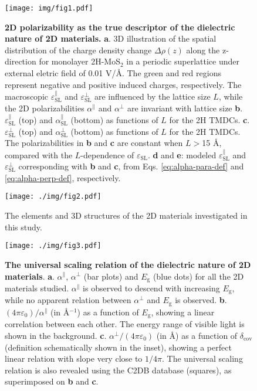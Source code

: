 \documentclass[journal=ancac3,manuscript=article,email=true,hyperref=true,keywords=false]{achemso}
\begin{document}
\label{sec:org34cbe74}
\begin{figure}[htbp]
\centering
\texttt{[image: img/fig1.pdf]}
\caption{\label{fig-1} \textbf{2D polarizability as the true
    descriptor of the dielectric nature of 2D materials.}
  \textbf{a}. 3D illustration of the spatial distribution of the
  charge density change $\Delta \rho(z)$ along the z-direction for
  monolayer 2H-MoS$_{2}$ in a periodic superlattice under external
  eletric field of 0.01 V/\AA{}.  The green and red regions represent
  negative and positive induced charges, respectively. The macroscopic
  $\varepsilon_{\mathrm{SL}}^{\parallel}$ and
  $\varepsilon_{\mathrm{SL}}^{\perp}$ are influenced by the lattice
  size $L$, while the 2D polarizabilities $\alpha^{\parallel}$ and
  $\alpha^{\perp}$ are invariant with lattice size \textbf{b}.
  $\varepsilon^{\parallel}_{\mathrm{SL}}$ (top) and
  $\alpha_{\mathrm{SL}}^{\parallel}$ (bottom) as functions of $L$ for
  the 2H TMDCs. \textbf{c}.  $\varepsilon^{\perp}_{\mathrm{SL}}$ (top)
  and $\alpha_{\mathrm{SL}}^{\perp}$ (bottom) as functions of $L$ for
  the 2H TMDCs. The polarizabilities in \textbf{b} and \textbf{c} are
  constant when $L>$15 \AA{}, compared with the $L$-dependence of
  $\varepsilon_{\mathrm{SL}}$. \textbf{d} and \textbf{e}: modeled
  $\varepsilon_{\mathrm{SL}}^{\parallel}$ and
  $\varepsilon_{\mathrm{SL}}^{\perp}$ corresponding with \textbf{b}
  and \textbf{c}, from Eqs. \ref{eq:alpha-para-def} and
  \ref{eq:alpha-perp-def}, respectively.}
\end{figure}

\begin{figure}[htbp]
\centering
\texttt{[image: ./img/fig2.pdf]}
\caption{\label{fig-2} The elements and 3D structures of the 2D
  materials investigated in this study.}
\end{figure}

\begin{figure}[htbp]
\centering
\texttt{[image: ./img/fig3.pdf]}
\caption{\label{fig-3} \textbf{The universal scaling relation of the
    dielectric nature of 2D
    materials}. \textbf{a}. $\alpha^{\parallel}$, $\alpha^{\perp}$
  (bar plots) and $E_{\mathrm{g}}$ (blue dots) for all the 2D
  materials studied.  $\alpha^{\parallel}$ is observed to descend with
  increasing $E_{\mathrm{g}}$, while no apparent relation between
  $\alpha^{\perp}$ and $E_{\mathrm{g}}$ is
  observed. \textbf{b}. $(4\pi \varepsilon_{0})/\alpha^{\parallel}$
  (in \AA{}$^{-1}$) as a function of $E_{\mathrm{g}}$, showing a linear
  correlation between each other. The energy range of visible light is
  shown in the
  background. \textbf{c}. $\alpha^{\perp}/(4\pi\varepsilon_{0})$ (in
  \AA{}) as a function of $\delta_{\mathrm{cov}}$ (definition
  schematically shown in the inset), showing a perfect linear relation
  with slope very close to $1/4\pi$. The universal scaling relation is
  also revealed using the C2DB database (squares), as superimposed on \textbf{b}
  and \textbf{c}.}
\end{figure}
\end{document}
